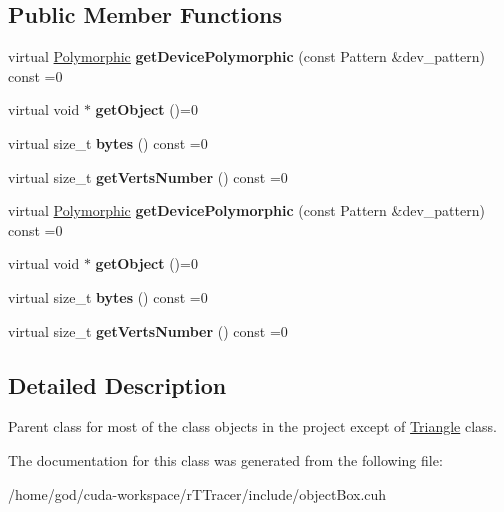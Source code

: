 \subsection*{Public Member Functions}
\begin{DoxyCompactItemize}
\item 
virtual \hyperlink{struct_polymorphic}{Polymorphic} {\bfseries get\+Device\+Polymorphic} (const Pattern \&dev\+\_\+pattern) const =0\hypertarget{class_host_object_a41171fd7c423b8b766d06f55fa4be867}{}\label{class_host_object_a41171fd7c423b8b766d06f55fa4be867}

\item 
virtual void $\ast$ {\bfseries get\+Object} ()=0\hypertarget{class_host_object_a32c392f12e133d9ecfce76a2e5135c94}{}\label{class_host_object_a32c392f12e133d9ecfce76a2e5135c94}

\item 
virtual size\+\_\+t {\bfseries bytes} () const =0\hypertarget{class_host_object_aacb8c44633ea4411d0972f933870557e}{}\label{class_host_object_aacb8c44633ea4411d0972f933870557e}

\item 
virtual size\+\_\+t {\bfseries get\+Verts\+Number} () const =0\hypertarget{class_host_object_a0d6005a4895a5246deae24daf2c71ca7}{}\label{class_host_object_a0d6005a4895a5246deae24daf2c71ca7}

\item 
virtual \hyperlink{struct_polymorphic}{Polymorphic} {\bfseries get\+Device\+Polymorphic} (const Pattern \&dev\+\_\+pattern) const =0\hypertarget{class_host_object_a41171fd7c423b8b766d06f55fa4be867}{}\label{class_host_object_a41171fd7c423b8b766d06f55fa4be867}

\item 
virtual void $\ast$ {\bfseries get\+Object} ()=0\hypertarget{class_host_object_a32c392f12e133d9ecfce76a2e5135c94}{}\label{class_host_object_a32c392f12e133d9ecfce76a2e5135c94}

\item 
virtual size\+\_\+t {\bfseries bytes} () const =0\hypertarget{class_host_object_aacb8c44633ea4411d0972f933870557e}{}\label{class_host_object_aacb8c44633ea4411d0972f933870557e}

\item 
virtual size\+\_\+t {\bfseries get\+Verts\+Number} () const =0\hypertarget{class_host_object_a0d6005a4895a5246deae24daf2c71ca7}{}\label{class_host_object_a0d6005a4895a5246deae24daf2c71ca7}

\end{DoxyCompactItemize}


\subsection{Detailed Description}
Parent class for most of the class objects in the project except of \hyperlink{class_triangle}{Triangle} class. 

The documentation for this class was generated from the following file\+:\begin{DoxyCompactItemize}
\item 
/home/god/cuda-\/workspace/r\+T\+Tracer/include/object\+Box.\+cuh\end{DoxyCompactItemize}
